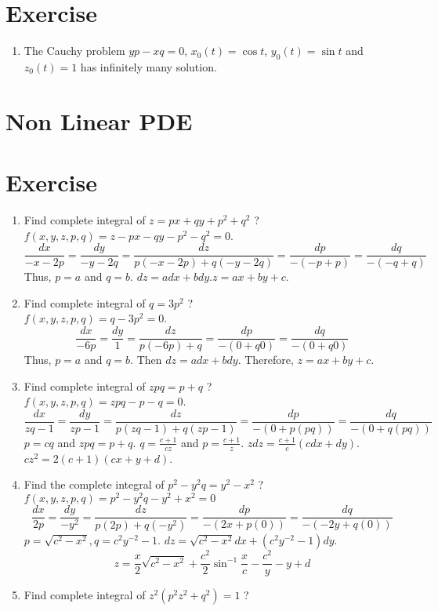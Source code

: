 \section{Exercise}
\begin{enumerate}
	\item The Cauchy problem $yp-xq = 0$, $x_0(t) = \cos t$, $y_0(t) = \sin t$ and $z_0(t) = 1$ has infinitely many solution.
\end{enumerate}

\section{Non Linear PDE}
\section{Exercise}
\begin{enumerate}
	\item Find complete integral of $z = px + qy + p^2 + q^2$ ?\\ $f(x,y,z,p,q) = z - px - qy - p^2 - q^2 = 0$.
	$$\frac{dx}{-x-2p} = \frac{dy}{-y-2q} = \frac{dz}{p(-x-2p) + q(-y-2q)} = \frac{dp}{-(-p+p)} = \frac{dq}{-(-q+q)}$$
	Thus, $p = a$ and $q = b$. $dz = adx + bdy$.$z = ax + by + c$.
\item Find complete integral of $q = 3p^2$ ?\\ $f(x,y,z,p,q) = q-3p^2 = 0$.
	$$\frac{dx}{-6p} = \frac{dy}{1} = \frac{dz}{p(-6p)+q} = \frac{dp}{-(0+q0)} = \frac{dq}{-(0+q0)}$$
	Thus, $p = a$ and $q = b$. Then $dz = adx + bdy$. Therefore, $z = ax + by + c$.
\item Find complete integral of $zpq = p+q$ ?\\ $f(x,y,z,p,q) = zpq - p - q = 0$.
	$$\frac{dx}{zq - 1} = \frac{dy}{zp - 1} = \frac{dz}{p(zq-1)+q(zp-1)} = \frac{dp}{-(0+p(pq))} = \frac{dq}{-(0+q(pq))}$$
		$p = cq$ and $zpq = p + q$. $q = \frac{c + 1}{cz}$ and $p = \frac{c+1}{z}$. $zdz = \frac{c+1}{c} (cdx + dy)$.\\ $cz^2 = 2(c+1)(cx + y + d)$.
	\item Find the complete integral of $p^2 - y^2q = y^2 - x^2$ ?\\ $f(x,y,z,p,q) = p^2 - y^2q - y^2 + x^2 = 0$
	$$\frac{dx}{2p} = \frac{dy}{-y^2} = \frac{dz}{p(2p)+q(-y^2)} = \frac{dp}{-(2x+p(0))} = \frac{dq}{-(-2y+q(0))}$$
	$p = \sqrt{c^2-x^2}, q = c^2y^{-2}-1$. $dz = \sqrt{c^2-x^2} dx + (c^2y^{-2} -1)dy$.
		$$z = \frac{x}{2} \sqrt{c^2 - x^2} + \frac{c^2}{2} \sin^{-1} \frac{x}{c} - \frac{c^2}{y} - y + d$$
	\item Find complete integral of $z^2(p^2z^2+q^2) = 1$ ?\\

\end{enumerate}
